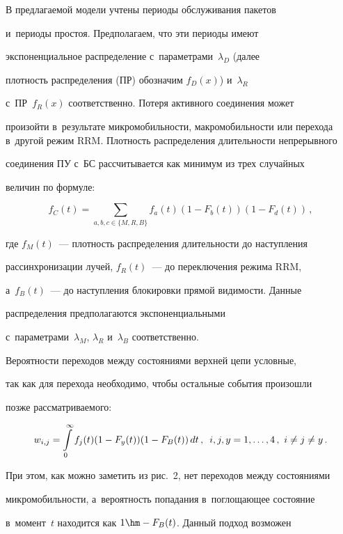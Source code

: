      В предлагаемой модели учтены периоды обслуживания пакетов 


и~периоды простоя. Предполагаем, что эти периоды имеют 


экспоненциальное распределение с~параметрами~$\lambda_D$ (далее 


плотность распределения (ПР) обозначим $f_D(x)$) и~$\lambda_R$ 


с~ПР~$f_R(x)$ соответственно. Потеря активного соединения может 


произойти в~результате микромобильности, макромобильности или перехода в~другой режим RRM. Плотность распределения длительности непрерывного 


соединения ПУ с~БС рассчитывается как минимум из трех случайных 


величин по формуле:


     $$


     f_C(t)=\sum\limits_{a,b,c\in \{M, R, B\}} f_a(t)(1-F_b(t)) (1-F_d(t))\,,


     $$


где $f_M(t)$~--- плотность распределения длительности до наступления 


рассинхронизации лучей, $f_R(t)$~--- до переключения режима RRM, 


а~$f_B(t)$~--- до наступления блокировки прямой видимости. Данные 


распределения предполагаются экспоненциальными 


с~параметрами~$\lambda_M$, $\lambda_R$ и~$\lambda_B$ соответственно.


     


     Вероятности переходов между состояниями верхней цепи условные, 


так как для перехода необходимо, чтобы остальные события произошли 


позже рас\-смат\-ри\-ва\-емого: 


     $$


     w_{i,j}= \int\limits_0^\infty f_j(t) (1-F_y(t)) (1-F_B(t))\,dt\,,\enskip i, j, y 


=1,\ldots , 4\,,\ i\not= j\not= y\,.


     $$


При этом, как можно заметить из рис.~2, нет переходов между состояниями 


мик\-ро\-мо\-биль\-ности, а~ве\-ро\-ят\-ность попадания в~поглощающее состояние 


в~момент~$t$ находится как $1\hm- F_B(t)$. Данный подход воз\-мо\-жен 


